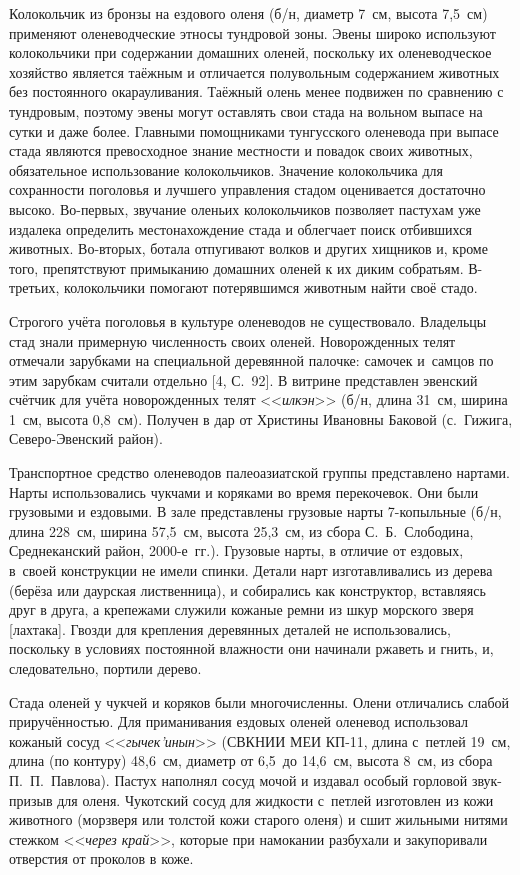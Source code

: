 Колокольчик из бронзы на ездового оленя (б/н, диаметр 7~см, высота 7,5~см) применяют оленеводческие этносы тундровой зоны. Эвены широко используют колокольчики при содержании домашних оленей, поскольку их оленеводческое хозяйство является таёжным и отличается полувольным содержанием животных без постоянного окарауливания. Таёжный олень менее подвижен по сравнению с тундровым, поэтому эвены могут оставлять свои стада на вольном выпасе на сутки и даже более. Главными помощниками тунгусского оленевода при выпасе стада являются превосходное знание местности и повадок своих животных, обязательное использование колокольчиков. Значение колокольчика для сохранности поголовья и лучшего управления стадом оценивается достаточно высоко. Во-первых, звучание оленьих колокольчиков позволяет пастухам уже издалека определить местонахождение стада и облегчает поиск отбившихся животных. Во-вторых, ботала отпугивают волков и других хищников и, кроме того, препятствуют примыканию домашних оленей к их диким собратьям. В-третьих, колокольчики помогают потерявшимся животным найти своё стадо.

Строгого учёта поголовья в культуре оленеводов не существовало. Владельцы стад знали примерную численность своих оленей. Новорожденных телят отмечали зарубками на специальной деревянной палочке: самочек и~самцов по этим зарубкам считали отдельно [4, С.~92]. В витрине представлен эвенский счётчик для учёта новорожденных телят <<\textit{илкэн}>> (б/н, длина 31~см, ширина 1~см, высота 0,8~см). Получен в дар от Христины Ивановны Баковой (с.~Гижига, Северо-Эвенский район).

Транспортное средство оленеводов палеоазиатской группы представлено нартами. Нарты использовались чукчами и коряками во время перекочевок. Они были грузовыми и ездовыми. В зале представлены грузовые нарты 7-копыльные (б/н, длина 228~см, ширина 57,5~см, высота 25,3~см, из сбора С.~Б.~Слободина, Среднеканский район, 2000-е~гг.). Грузовые нарты, в отличие от ездовых, в~своей конструкции не имели спинки. Детали нарт изготавливались из дерева (берёза или даурская лиственница), и собирались как конструктор, вставляясь друг в друга, а крепежами служили кожаные ремни из шкур морского зверя [лахтака]. Гвозди для крепления деревянных деталей не использовались, поскольку в условиях постоянной влажности они начинали ржаветь и гнить, и, следовательно, портили дерево.

Стада оленей у чукчей и коряков были многочисленны. Олени отличались слабой приручённостью. Для приманивания ездовых оленей оленевод использовал кожаный сосуд <<\textit{гычек'инын}>> (СВКНИИ МЕИ КП-11, длина с~петлей 19~см, длина (по контуру) 48,6~см, диаметр от 6,5~до 14,6~см, высота 8~см, из сбора П.~П.~Павлова). Пастух наполнял сосуд мочой и издавал особый горловой звук-призыв для оленя. Чукотский сосуд для жидкости с~петлей изготовлен из кожи животного (морзверя или толстой кожи старого оленя) и сшит жильными нитями стежком <<\textit{через край}>>, которые при намокании разбухали и закупоривали отверстия от проколов в коже.

